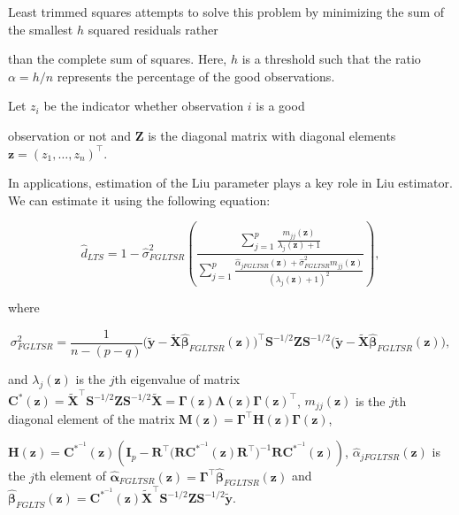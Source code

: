 \documentclass[10pt,twoside]{article}
\numberwithin{equation}{section}
\begin{document}
Least trimmed squares attempts to solve this problem by minimizing the sum of the smallest $h$ squared residuals rather

than the complete sum of squares. Here, $h$ is a threshold such that the ratio $\alpha=h/n$ represents the percentage of the good observations.



Let $z_i$ be the indicator whether observation $i$ is a good

observation or not and $\boldsymbol Z$ is the diagonal matrix with diagonal elements $\boldsymbol z=(z_{1},\ldots,z_{n})^\top$.

In applications, estimation of the Liu parameter plays a key role in Liu estimator. We can estimate it using the following equation:

$$\hat d_{LTS}=1-\hat\sigma^2_{FGLTSR}\left(\frac{\sum_{j=1}^p\frac{ m_{jj}(\boldsymbol z)}{\lambda_{j}(\boldsymbol z)+1}}{\sum_{j=1}^p\frac{\hat\alpha_{jFGLTSR}(\boldsymbol z)+\hat\sigma^2_{FGLTSR}m_{jj}(\boldsymbol z)  }{(\lambda_{j}(\boldsymbol z)+1)^2}}\right),$$

where

$$\sigma^2_{FGLTSR}=\frac{1}{n-(p-q)}\big(\widetilde{\boldsymbol y}-\widetilde{\boldsymbol X}\hat{\boldsymbol\beta}_{FGLTSR}(\boldsymbol z)\big)^\top\boldsymbol S^{-1/2}\boldsymbol Z\boldsymbol S^{-1/2}\big(\widetilde{\boldsymbol y}-\widetilde{\boldsymbol X} \hat{\boldsymbol\beta}_{FGLTSR}(\boldsymbol z)\big),$$

and $\lambda_{j}(\boldsymbol z)$ is the $j$th eigenvalue of matrix $\boldsymbol C^*(\boldsymbol z)=\widetilde{\boldsymbol X}^\top\boldsymbol S^{-1/2}\boldsymbol Z\boldsymbol S^{-1/2}\widetilde{\boldsymbol X}=\boldsymbol\Gamma(\boldsymbol z)\boldsymbol\Lambda(\boldsymbol z)\boldsymbol\Gamma(\boldsymbol z)^\top$, $m_{jj}(\boldsymbol z)$ is the $j$th diagonal element of the matrix $\boldsymbol M(\boldsymbol z)=\boldsymbol\Gamma^\top\boldsymbol H(\boldsymbol z)\boldsymbol\Gamma(\boldsymbol z)$,

$\boldsymbol H(\boldsymbol z)=\boldsymbol C^{*^{-1}}(\boldsymbol z)\left(\boldsymbol I_p-\boldsymbol R^{\top}\big(\boldsymbol R\boldsymbol C^{*^{-1}}(\boldsymbol z)\boldsymbol R^{\top}\big)^{-1}\boldsymbol R\boldsymbol C^{*^{-1}}(\boldsymbol z)\right)$,  $\hat\alpha_{jFGLTSR}(\boldsymbol z)$ is the $j$th element of $\hat{\boldsymbol\alpha}_{FGLTSR}(\boldsymbol z)=\boldsymbol\Gamma^\top\hat{\boldsymbol\beta}_{FGLTSR}(\boldsymbol z)$ and $\hat{\boldsymbol\beta}_{FGLTS}(\boldsymbol z)=\boldsymbol C^{*^{-1}}(\boldsymbol z)\widetilde{\boldsymbol X}^\top\boldsymbol S^{-1/2}\boldsymbol Z\boldsymbol S^{-1/2}\widetilde{\boldsymbol y}$.
\end{document}
